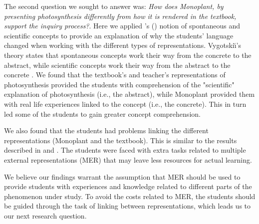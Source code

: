 The second question we sought to answer was: \emph{How does Monoplant, by presenting photosynthesis differently from how it is rendered in the textbook, support the inquiry process?}. Here we applied \citeauthor{vygotsky2012thought}'s (\citeyear{vygotsky2012thought}) notion of spontaneous and scientific concepts to provide an explanation of why the students' language changed when working with the different types of representations. Vygotski{\u\i}'s theory states that spontaneous concepts work their way from the concrete to the abstract, while scientific concepts work their way from the abstract to the concrete \citep{vygotsky2012thought}. We found that the textbook's and teacher's representations of photosynthesis provided the students with comprehension of the "scientific" explanation of photosynthesis (i.e., the abstract), while Monoplant provided them with real life experiences linked to the concept (i.e., the concrete). This in turn led some of the students to gain greater concept comprehension. 

We also found that the students had problems linking the different representations (Monoplant and the textbook). This is similar to the results described in \citet{ainsworth1999functions} and \citet{van2006supporting}. The students were faced with extra tasks related to multiple external representations (MER) that may leave less resources for actual learning. 

We believe our findings warrant the assumption that MER should be used to provide students with experiences and knowledge related to different parts of the phenomenon under study. To avoid the costs related to MER, the students should be guided through the task of linking between representations, which leads us to our next research question.





